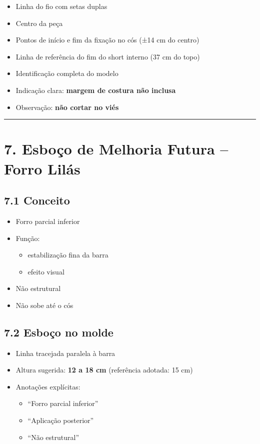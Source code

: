 \documentclass[
  10pt,oneside]{article}
\providecommand{\tightlist}{%
  \setlength{\itemsep}{0pt}\setlength{\parskip}{0pt}}
\begin{document}
\begin{itemize}
\tightlist
\item
  Linha do fio com setas duplas
\item
  Centro da peça
\item
  Pontos de início e fim da fixação no cós (±14 cm do centro)
\item
  Linha de referência do fim do short interno (37 cm do topo)
\item
  Identificação completa do modelo
\item
  Indicação clara: \textbf{margem de costura não inclusa}
\item
  Observação: \textbf{não cortar no viés}
\end{itemize}

\begin{center}\rule{0.5\linewidth}{0.5pt}\end{center}

\section{7. Esboço de Melhoria Futura -- Forro Lilás}\label{esbouxe7o-de-melhoria-futura-forro-liluxe1s}

\subsection{7.1 Conceito}\label{conceito-1}

\begin{itemize}
\tightlist
\item
  Forro parcial inferior
\item
  Função:

  \begin{itemize}
  \tightlist
  \item
    estabilização fina da barra
  \item
    efeito visual
  \end{itemize}
\item
  Não estrutural
\item
  Não sobe até o cós
\end{itemize}

\subsection{7.2 Esboço no molde}\label{esbouxe7o-no-molde}

\begin{itemize}
\tightlist
\item
  Linha tracejada paralela à barra
\item
  Altura sugerida: \textbf{12 a 18 cm} (referência adotada: 15 cm)
\item
  Anotações explícitas:

  \begin{itemize}
  \tightlist
  \item
    ``Forro parcial inferior''
  \item
    ``Aplicação posterior''
  \item
    ``Não estrutural''
  \end{itemize}
\end{itemize}
\end{document}
